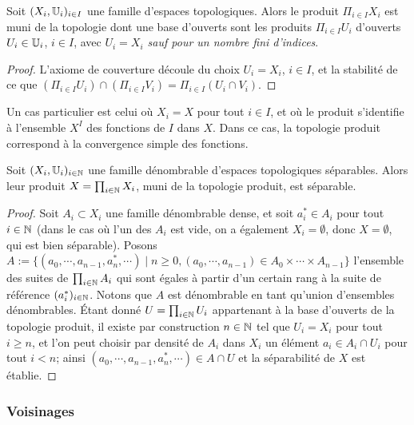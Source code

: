\begin{exemple}
\label{ex:topoProduit}
%
	Soit $(X_i, \mathbb{U}_i)_{i \in I}$ une famille d'espaces topologiques. Alors le produit $\Pi_{i \in I} X_i$ est muni de la topologie dont une base d'ouverts sont les produits 
	$\Pi_{i \in I} U_i$ d'ouverts $U_i \in \mathbb{U}_i$, $i \in I$, avec \emph{$U_i = X_i$ sauf pour un nombre fini d'indices}. 
\end{exemple}

\begin{proof}
	L'axiome de couverture découle du choix $U_i = X_i$, $i \in I$, et la stabilité de ce que 
	$(\Pi_{i \in I} U_i) \cap (\Pi_{i \in I} V_i) = \Pi_{i \in I} (U_i\cap V_i)$.
\end{proof}

Un cas particulier est celui où $X_i = X$ pour tout $i \in I$, et où le produit s'identifie à l'ensemble $X^I$ des fonctions de $I$ dans $X$. Dans ce cas, la topologie produit correspond à la convergence simple des fonctions. 

\begin{proposition}
\label{prop:produit_separable}
%
Soit $(X_i,\mathbb{U}_i)_{i\in \mathbb{N}}$ une famille dénombrable d'espaces topologiques séparables. Alors leur produit $X = \prod_{i \in \mathbb{N}} X_i$, muni de la topologie produit, est séparable.
\end{proposition}

\begin{proof}
	Soit $A_i \subset X_i$ une famille dénombrable dense, et soit $a_i^* \in A_i$ pour tout $i \in \mathbb{N}$ (dans le cas où l'un des $A_i$ est vide, on a également $X_i=\emptyset$, donc $X=\emptyset$, qui est bien séparable).
	Posons $A := \{(a_0,\cdots, a_{n-1}, a_n^*,\cdots)\mid n\geq 0, (a_0,\cdots,a_{n-1}) \in A_0 \times \cdots \times A_{n-1}\}$ l'ensemble des suites de $\prod_{i \in \mathbb{N}} A_i$ qui sont égales à partir d'un certain rang à la suite de référence $(a_i^*)_{i \in \mathbb{N}}$. Notons que $A$ est dénombrable en tant qu'union d'ensembles dénombrables. Étant donné $U = \prod_{i \in \mathbb{N}} U_i$ appartenant à la base d'ouverts de la topologie produit, il existe par construction $n\in \mathbb{N}$ tel que $U_i = X_i$ pour tout $i \geq n$, et l'on peut choisir par densité de $A_i$ dans $X_i$ un élément $a_i \in A_i \cap U_i$ pour tout $i<n$; ainsi $(a_0,\cdots,a_{n-1},a_n^*,\cdots) \in A \cap U$ et la séparabilité de $X$ est établie.
\end{proof}

\subsubsection{Voisinages}
\label{subsubsec:Vois}

